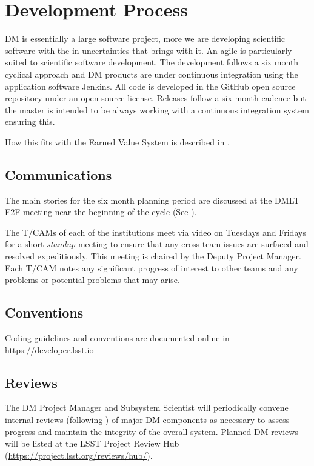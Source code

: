 \section{Development Process} \label{sect:devproc}

DM is essentially a large software project, more we are developing scientific software with the in uncertainties that brings with it.
An agile \citep{it:agile} is particularly suited to scientific software development.  The development follows a six month  cyclical approach and  DM  products are under continuous
integration using the application software Jenkins. All code is developed in the GitHub open source repository under an open source license.
Releases follow a six month cadence but the master is intended to be always working with a continuous integration system ensuring this.

How this fits with the Earned Value System is described in .


\subsection{Communications}

The main stories for the six month planning period are discussed at the DMLT F2F meeting near the beginning of the cycle (See ).

The T/CAMs of each of the institutions meet via video on Tuesdays and Fridays for a short \emph{standup} meeting to ensure that any cross-team issues are surfaced and resolved expeditiously.
This meeting is chaired by the Deputy Project Manager.
Each T/CAM notes any significant progress of interest to other teams and any problems or potential problems that may arise.

\subsection{Conventions}
Coding guidelines and conventions are documented online in \url{https://developer.lsst.io}

\subsection{Reviews} \label{sect:reviews}

The DM Project Manager and Subsystem Scientist will periodically convene internal reviews (following )
of major DM components as necessary to assess progress and maintain the integrity of the overall system. Planned DM reviews will be listed at the LSST Project Review Hub (\url{https://project.lsst.org/reviews/hub/}).

